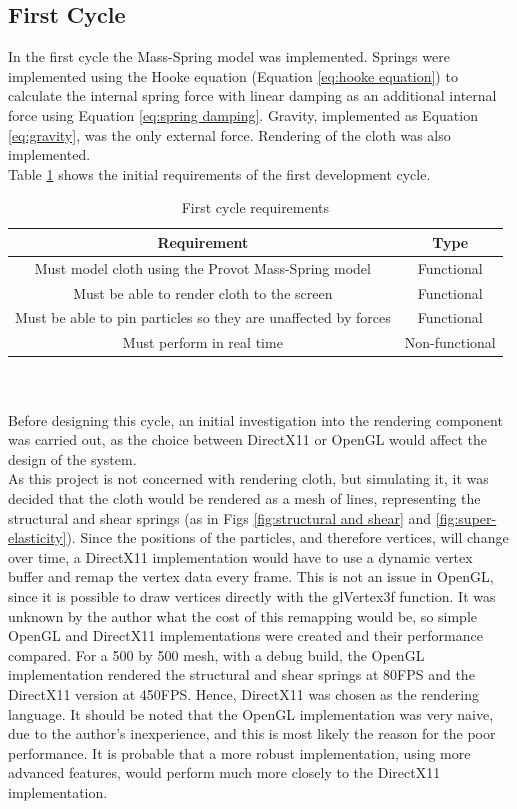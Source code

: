 \subsection{First Cycle}
In the first cycle the Mass-Spring model was implemented. Springs were implemented using the Hooke equation (Equation \ref{eq:hooke equation}) to calculate the internal spring force with linear damping as an additional internal force using Equation \ref{eq:spring damping}. Gravity, implemented as Equation \ref{eq:gravity}, was the only external force. Rendering of the cloth was also implemented.
\\Table \ref{tab:cycle 1 require} shows the initial requirements of the first development cycle.
\begin{table}[tp]
   \begin{minipage}{\textwidth}
      \begin{center}
         \begin{tabular}{c|c}
           Requirement & Type\\
           \hline
           Must model cloth using the Provot Mass-Spring model & Functional\\
           Must be able to render cloth to the screen & Functional\\
           Must be able to pin particles so they are unaffected by forces & Functional\\
           Must perform in real time& Non-functional\\
         \end{tabular}
      \end{center}
   \end{minipage}
   \caption{First cycle requirements}
   \label{tab:cycle 1 require}
\end{table}
\\\\Before designing this cycle, an initial investigation into the rendering component was carried out, as the choice between DirectX11 or OpenGL would affect the design of the system.
\\As this project is not concerned with rendering cloth, but simulating it, it was decided that the cloth would be rendered as a mesh of lines, representing the structural and shear springs (as in Figs \ref{fig:structural and shear} and \ref{fig:super-elasticity}). Since the positions of the particles, and therefore vertices, will change over time, a DirectX11 implementation would have to use a dynamic vertex buffer and remap the vertex data every frame. This is not an issue in OpenGL, since it is possible to draw vertices directly with the glVertex3f function. It was unknown by the author what the cost of this remapping would be, so simple OpenGL and DirectX11 implementations were created and their performance compared. For a 500 by 500 mesh, with a debug build, the OpenGL implementation rendered the structural and shear springs at 80FPS and the DirectX11 version at 450FPS. Hence, DirectX11 was chosen as the rendering language. It should be noted that the OpenGL implementation was very naive, due to the author's inexperience, and this is most likely the reason for the poor performance. It is probable that a more robust implementation, using more advanced features, would perform much more closely to the DirectX11 implementation.
